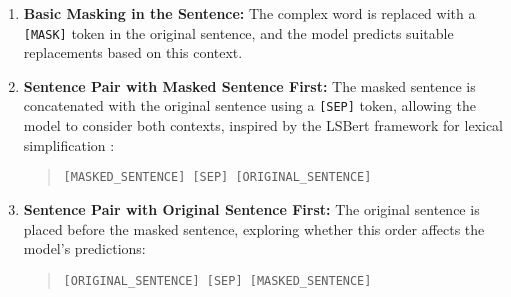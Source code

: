 \begin{enumerate}
    \item \textbf{Basic Masking in the Sentence:} The complex word is replaced with a \texttt{[MASK]} token in the original sentence, and the model predicts suitable replacements based on this context.
    \item \textbf{Sentence Pair with Masked Sentence First:} The masked sentence is concatenated with the original sentence using a \texttt{[SEP]} token, allowing the model to consider both contexts, inspired by the LSBert framework for lexical simplification \cite{Simplification_LSBert}:
        \begin{quote}
            \texttt{[MASKED\_SENTENCE] [SEP] [ORIGINAL\_SENTENCE]}
        \end{quote}
    \item \textbf{Sentence Pair with Original Sentence First:} The original sentence is placed before the masked sentence, exploring whether this order affects the model's predictions:
        \begin{quote}
            \texttt{[ORIGINAL\_SENTENCE] [SEP] [MASKED\_SENTENCE]}
        \end{quote}
\end{enumerate}